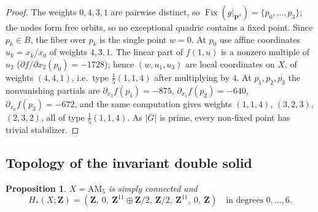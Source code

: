 \documentclass[11pt]{amsart}
\numberwithin{equation}{section}
\newtheorem{proposition}[theorem]{Proposition}
\theoremstyle{definition}
\theoremstyle{remark}
\newcommand{\Z}{\mathbf Z}
\newcommand{\PP}{\mathbf P}
\DeclareMathOperator{\Fix}{Fix}
\begin{document}
\begin{proof}
The weights $0,4,3,1$ are pairwise distinct, so $\Fix(g|_{\PP^3})=
\{p_0,\dots,p_3\}$; the nodes form free orbits, so no exceptional quadric
contains a fixed point. Since $p_k\in B$, the fiber over $p_k$ is the single
point $w=0$. At $p_0$ use affine coordinates $u_k=x_k/x_0$ of weights
$4,3,1$. The linear part of $f(1,u)$ is a nonzero multiple of $u_2$
($\partial f/\partial x_2(p_0)=-1728$); hence $(w,u_1,u_3)$ are local
coordinates on $X$, of weights $(4,4,1)$, i.e.\ type $\frac15(1,1,4)$
after multiplying by $4$. At $p_1,p_2,p_3$ the nonvanishing partials are
$\partial_{x_3}f(p_1)=-875$, $\partial_{x_1}f(p_2)=-640$,
$\partial_{x_0}f(p_3)=-672$, and the same computation gives weights
$(1,1,4)$, $(3,2,3)$, $(2,3,2)$, all of type $\frac15(1,1,4)$. As $|G|$ is
prime, every non-fixed point has trivial stabilizer.
\end{proof}

\subsection{Topology of the invariant double solid}

\begin{proposition}\label{prop:AM5}
$X=\mathrm{AM}_5$ is simply connected and
\[
  H_*(X;\Z)=(\Z,\ 0,\ \Z^{11}\oplus\Z/2,\ \Z/2,\ \Z^{11},\ 0,\ \Z)
  \quad\text{in degrees }0,\dots,6.
\]
\end{proposition}
\end{document}
